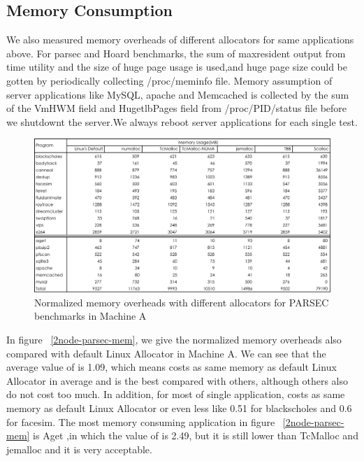 \subsection{Memory Consumption}
\label{sec:memory}

We also measured memory overheads of different allocators for same applications above. For parsec and Hoard benchmarks, the sum of maxresident output from time utility and the size of huge page usage is used,and huge page size could be gotten by periodically collecting /proc/meminfo file. Memory assumption of server applications like MySQL, apache and Memcached is collected by the sum of the VmHWM field and HugetlbPages field from /proc/PID/status file before we shutdownt the server.We always reboot server applications for each single test. 

\begin{figure}[H]
    \centering
    \includegraphics[width=\textwidth]{figure/8-node-memory.pdf}
    \caption{Normalized memory overheads with different allocators for PARSEC benchmarks in Machine A}
    \label{8node-parsec-mem}
\end{figure}

In figure ~\ref{2node-parsec-mem}, we give the normalized memory overheads also compared with default Linux Allocator in Machine A. We can see that the average value of \NM{} is 1.09, which means \NM{} costs as same memory as default Linux Allocator in average and \NM{} is the best compared with others, although others also do not cost too much. In addition, for most of single application, \NM{} costs as same memory as default Linux Allocator or even less like 0.51 for blackscholes and 0.6 for facesim. The most memory consuming application in figure ~\ref{2node-parsec-mem} is Aget ,in which the value of \NM{} is 2.49, but it is still lower than TcMalloc and jemalloc and it is very acceptable. 

